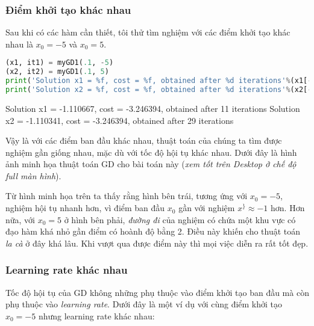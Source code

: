  
 
\subsubsection{Điểm khởi tạo khác nhau}
 
Sau khi có các hàm cần thiết, tôi thử tìm nghiệm với các điểm khởi tạo khác nhau là $x_{0} = -5$ và $x_{0} = 5$. 
 
 
\begin{lstlisting}[language=Python]
(x1, it1) = myGD1(.1, -5) 
(x2, it2) = myGD1(.1, 5) 
print('Solution x1 = %f, cost = %f, obtained after %d iterations'%(x1[-1], cost(x1[-1]), it1)) 
print('Solution x2 = %f, cost = %f, obtained after %d iterations'%(x2[-1], cost(x2[-1]), it2)) 
\end{lstlisting}
 
    Solution x1 = -1.110667, cost = -3.246394, obtained after 11 iterations 
    Solution x2 = -1.110341, cost = -3.246394, obtained after 29 iterations 
 
 
Vậy là với các điểm ban đầu khác nhau, thuật toán của chúng ta tìm được nghiệm gần giống nhau, mặc dù với tốc độ hội tụ khác nhau. Dưới đây là hình ảnh minh họa thuật toán GD cho bài toán này (\textit{xem tốt trên Desktop ở chế độ full màn hình}). 
 
 
 
Từ hình minh họa trên ta thấy rằng hình bên trái, tương ứng với $x_{0} = -5$, nghiệm hội tụ nhanh hơn, vì điểm ban đầu $x_0$ gần với nghiệm $ x^\} \approx -1$  hơn. Hơn nữa, với $x_{0} = 5 $ ở hình bên phải, \textit{đường đi} của nghiệm có chứa 
  một khu vực có đạo hàm khá nhỏ gần điểm có hoành độ bằng 2. Điều này khiến cho thuật toán \textit{la cà} ở đây khá lâu. Khi vượt qua được điểm này thì mọi việc diễn ra rất tốt đẹp.  
 
 
\subsubsection{Learning rate khác nhau}
 
Tốc độ hội tụ của GD không những phụ thuộc vào điểm khởi tạo ban đầu mà còn phụ thuộc vào \textit{learning rate}. Dưới đây là một ví dụ với cùng điểm khởi tạo $x_{0} = -5$ nhưng learning rate khác nhau: 
 
